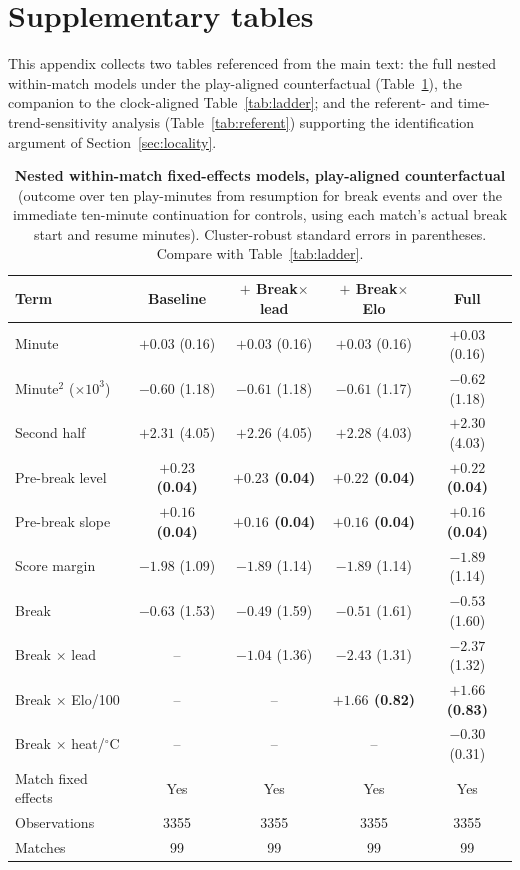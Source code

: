 \documentclass[11pt]{article}
\begin{document}
\section{Supplementary tables}
\label{app:tables}

This appendix collects two tables referenced from the main text: the full nested within-match models under the
play-aligned counterfactual (Table~\ref{tab:coefB}), the companion to the clock-aligned Table~\ref{tab:ladder};
and the referent- and time-trend-sensitivity analysis (Table~\ref{tab:referent}) supporting the identification
argument of Section~\ref{sec:locality}.

\begin{table}[h]
\centering\small
\caption{\textbf{Nested within-match fixed-effects models, play-aligned counterfactual} (outcome over ten
play-minutes from resumption for break events and over the immediate ten-minute continuation for controls,
using each match's actual break start and resume minutes). Cluster-robust standard errors in parentheses.
Compare with Table~\ref{tab:ladder}.}
\label{tab:coefB}
\begin{tabular}{lcccc}
\toprule
Term & Baseline & $+$ Break$\times$lead & $+$ Break$\times$Elo & Full \\
\midrule
Minute & $+0.03$ (0.16) & $+0.03$ (0.16) & $+0.03$ (0.16) & $+0.03$ (0.16) \\
Minute$^2$ ($\times10^{3}$) & $-0.60$ (1.18) & $-0.61$ (1.18) & $-0.61$ (1.17) & $-0.62$ (1.18) \\
Second half & $+2.31$ (4.05) & $+2.26$ (4.05) & $+2.28$ (4.03) & $+2.30$ (4.03) \\
Pre-break level & {\boldmath\bfseries $+0.23$ (0.04)} & {\boldmath\bfseries $+0.23$ (0.04)} & {\boldmath\bfseries $+0.22$ (0.04)} & {\boldmath\bfseries $+0.22$ (0.04)} \\
Pre-break slope & {\boldmath\bfseries $+0.16$ (0.04)} & {\boldmath\bfseries $+0.16$ (0.04)} & {\boldmath\bfseries $+0.16$ (0.04)} & {\boldmath\bfseries $+0.16$ (0.04)} \\
Score margin & $-1.98$ (1.09) & $-1.89$ (1.14) & $-1.89$ (1.14) & $-1.89$ (1.14) \\
Break & $-0.63$ (1.53) & $-0.49$ (1.59) & $-0.51$ (1.61) & $-0.53$ (1.60) \\
Break $\times$ lead & -- & $-1.04$ (1.36) & $-2.43$ (1.31) & $-2.37$ (1.32) \\
Break $\times$ Elo/100 & -- & -- & {\boldmath\bfseries $+1.66$ (0.82)} & {\boldmath\bfseries $+1.66$ (0.83)} \\
Break $\times$ heat/$^\circ$C & -- & -- & -- & $-0.30$ (0.31) \\
\midrule
Match fixed effects & Yes & Yes & Yes & Yes \\
Observations & 3355 & 3355 & 3355 & 3355 \\
Matches & 99 & 99 & 99 & 99 \\
\bottomrule
\end{tabular}
\end{table}
\end{document}
